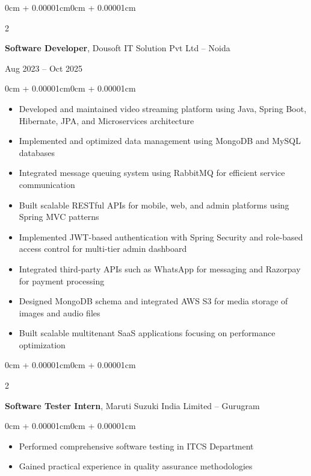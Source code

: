 \documentclass[11pt, letterpaper]{article}
\newenvironment{highlights}{
    \begin{itemize}[topsep=0.05cm, parsep=0.05cm, partopsep=0pt, itemsep=0pt, leftmargin=0cm + 8pt]
}{
    \end{itemize}
}
\newenvironment{onecolentry}{
    \begin{adjustwidth}{0cm + 0.00001cm}{0cm + 0.00001cm}
}{
    \end{adjustwidth}
}
\newenvironment{twocolentry}[2][]{
    \onecolentry
    \def\secondColumn{#2}
    \setcolumnwidth{\fill, 4.2cm}
    \begin{paracol}{2}
}{
    \switchcolumn \raggedleft \secondColumn
    \end{paracol}
    \endonecolentry
}
\begin{document}
    \vspace{0.1cm}

    \begin{twocolentry}{Aug 2023 – Oct 2025}
        \textbf{Software Developer}, Dousoft IT Solution Pvt Ltd -- Noida
    \end{twocolentry}

    \vspace{0.05cm}
    \begin{onecolentry}
      \begin{highlights}
        \item Developed and maintained video streaming platform using Java, Spring Boot, Hibernate, JPA, and Microservices architecture
        \item Implemented and optimized data management using MongoDB and MySQL databases
        \item Integrated message queuing system using RabbitMQ for efficient service communication
        \item Built scalable RESTful APIs for mobile, web, and admin platforms using Spring MVC patterns
        \item Implemented JWT-based authentication with Spring Security and role-based access control for multi-tier admin dashboard
        \item Integrated third-party APIs such as WhatsApp for messaging and Razorpay for payment processing
        \item Designed MongoDB schema and integrated AWS S3 for media storage of images and audio files
        \item Built scalable multitenant SaaS applications focusing on performance optimization
    \end{highlights}
    \end{onecolentry}

    \vspace{0.1cm}

    \begin{twocolentry}{2023}
        \textbf{Software Tester Intern}, Maruti Suzuki India Limited -- Gurugram
    \end{twocolentry}

    \vspace{0.05cm}
    \begin{onecolentry}
        \begin{highlights}
            \item Performed comprehensive software testing in ITCS Department
            \item Gained practical experience in quality assurance methodologies
        \end{highlights}
    \end{onecolentry}
\end{document}
